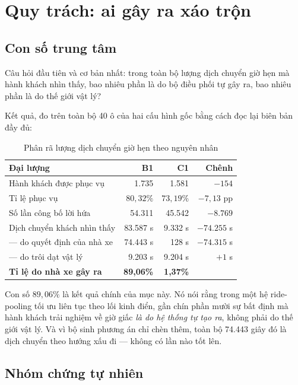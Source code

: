 \section{Quy trách: ai gây ra xáo trộn}
\label{muc:quytrach}

\subsection{Con số trung tâm}

Câu hỏi đầu tiên và cơ bản nhất: trong toàn bộ lượng dịch chuyển giờ hẹn mà hành khách nhìn
thấy, bao nhiêu phần là do bộ điều phối tự gây ra, bao nhiêu phần là do thế giới vật lý?

Kết quả, đo trên toàn bộ 40 ô của hai cấu hình gốc bằng cách đọc lại biên bản đầy đủ:

\begin{table}[htbp]
\centering
\caption{Phân rã lượng dịch chuyển giờ hẹn theo nguyên nhân}
\label{bang:quytrach}
\small
\begin{tabular}{@{}lrrr@{}}
\toprule
\textbf{Đại lượng} & \textbf{B1} & \textbf{C1} & \textbf{Chênh}\\
\midrule
Hành khách được phục vụ & 1.735 & 1.581 & $-154$\\
Tỉ lệ phục vụ & $80{,}32\%$ & $73{,}19\%$ & $-7{,}13$ pp\\
Số lần công bố lời hứa & 54.311 & 45.542 & $-8.769$\\
\midrule
Dịch chuyển khách nhìn thấy & 83.587 s & 9.332 s & $-74.255$ s\\
\quad --- do quyết định của nhà xe & 74.443 s & 128 s & $-74.315$ s\\
\quad --- do trôi dạt vật lý & 9.203 s & 9.204 s & $+1$ s\\
\midrule
\textbf{Tỉ lệ do nhà xe gây ra} & \textbf{89{,}06\%} & \textbf{1{,}37\%} & \\
\bottomrule
\end{tabular}
\end{table}

Con số $89{,}06\%$ là kết quả chính của mục này. Nó nói rằng trong một hệ ride-pooling tối ưu
liên tục theo lối kinh điển, gần chín phần mười sự bất định mà hành khách trải nghiệm về giờ
giấc \emph{là do hệ thống tự tạo ra}, không phải do thế giới vật lý. Và vì bộ sinh phương án
chỉ chèn thêm, toàn bộ 74.443 giây đó là dịch chuyển theo hướng xấu đi --- không có lần nào
tốt lên.

\subsection{Nhóm chứng tự nhiên}

